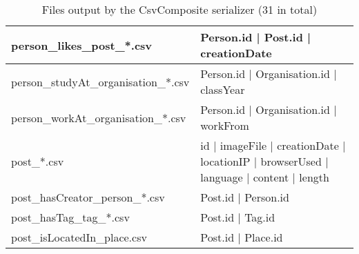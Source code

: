 \begin{table}[htb]
\begin{tabular}{|p{4.6cm}|p{11.4cm}|}
        person\_likes\_post\_*.csv               & Person.id | Post.id | creationDate                                                                          \\ \hline
        person\_studyAt\_organisation\_*.csv     & Person.id | Organisation.id | classYear                                                                     \\ \hline
        person\_workAt\_organisation\_*.csv      & Person.id | Organisation.id | workFrom                                                                      \\ \hline
        post\_*.csv                              & id | imageFile | creationDate | locationIP | browserUsed | language | content | length                      \\ \hline
        post\_hasCreator\_person\_*.csv          & Post.id | Person.id                                                                                         \\ \hline
        post\_hasTag\_tag\_*.csv                 & Post.id | Tag.id                                                                                            \\ \hline
        post\_isLocatedIn\_place.csv             & Post.id | Place.id                                                                                          \\ \hline
    \end{tabular}
    \caption{Files output by the CsvComposite serializer (31 in total)}
    \label{table:csv_composite}
\end{table}
